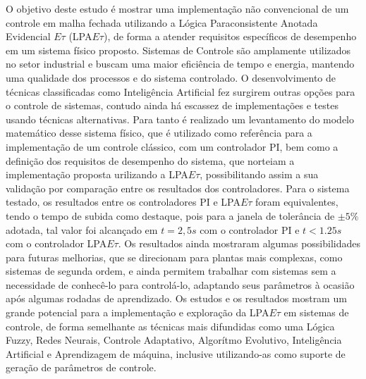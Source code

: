 





O objetivo deste estudo é mostrar uma implementação não convencional
de um controle em malha fechada utilizando a Lógica Paraconsistente
Anotada Evidencial $E\tau$ (LPA$E\tau$),
de forma a atender requisitos específicos de desempenho em um sistema físico proposto.
Sistemas de Controle são amplamente utilizados no setor industrial e
buscam uma maior eficiência de tempo e energia, mantendo uma qualidade
dos processos e do sistema controlado.
O desenvolvimento de técnicas classificadas como Inteligência
Artificial fez surgirem outras opções para o controle de sistemas,
contudo ainda há escassez de implementações e testes usando técnicas alternativas.
Para tanto é realizado um levantamento do modelo matemático desse
sistema físico, que é utilizado como referência para a implementação de um
controle clássico, com um controlador PI, bem como a definição dos
requisitos de desempenho do sistema, que norteiam a implementação
proposta urilizando a LPA$E\tau$, possibilitando assim a sua validação
por comparação entre os resultados dos controladores. 
Para o sistema testado, os resultados entre os controladores PI e
LPA$E\tau$ foram equivalentes, tendo o tempo de subida como
destaque, pois para a janela de tolerância de $\pm 5\%$ adotada, tal
valor foi alcançado em $t=2,5s$ com o controlador PI e $t<1.25s$ com o
controlador LPA$E\tau$. Os resultados ainda mostraram algumas
possibilidades para futuras melhorias, que se direcionam para plantas
mais complexas, como sistemas de segunda ordem, e ainda permitem
trabalhar com sistemas sem a necessidade de conhecê-lo para
controlá-lo, adaptando seus parâmetros à ocasião após algumas
rodadas de aprendizado.
Os estudos e os resultados mostram um grande potencial para a
implementação e exploração da LPA$E\tau$ em sistemas de controle, de forma
semelhante as técnicas mais difundidas como uma Lógica Fuzzy, Redes
Neurais, Controle Adaptativo, Algorítmo Evolutivo, Inteligência
Artificial e Aprendizagem de máquina, inclusive
utilizando-as como suporte de geração de parâmetros de controle.


